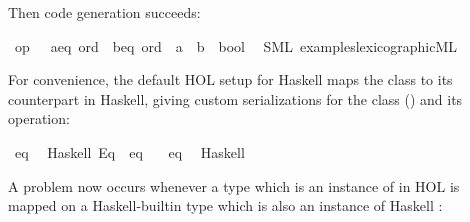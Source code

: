 \begin{isabellebody}
%
\endisatagproof
{\isafoldproof}%
%
\isadelimproof
%
\endisadelimproof
%
\begin{isamarkuptext}%
Then code generation succeeds:%
\end{isamarkuptext}%
\isamarkuptrue%
\isamarkupfalse%
\ {\isachardoublequoteopen}op\ {\isasymle}\ {\isasymColon}\ {\isacharprime}a{\isasymColon}{\isacharbraceleft}eq{\isacharcomma}\ ord{\isacharbraceright}\ {\isasymtimes}\ {\isacharprime}b{\isasymColon}{\isacharbraceleft}eq{\isacharcomma}\ ord{\isacharbraceright}\ {\isasymRightarrow}\ {\isacharprime}a\ {\isasymtimes}\ {\isacharprime}b\ {\isasymRightarrow}\ bool{\isachardoublequoteclose}\isanewline
\ \ {\isacharparenleft}SML\ {\isachardoublequoteopen}examples{\isacharslash}lexicographic{\isachardot}ML{\isachardoublequoteclose}{\isacharparenright}%
\begin{isamarkuptext}%
%
\end{isamarkuptext}%
\isamarkuptrue%
%
\isamarkuptrue%
%
\begin{isamarkuptext}%
For convenience, the default
  HOL setup for Haskell maps the  class to
  its counterpart in Haskell, giving custom serializations
  for the class (\isa{{\isasymCODECLASS}}) and its operation:%
\end{isamarkuptext}%
\isamarkuptrue%
%
\isadelimML
%
\endisadelimML
%
\isatagML
%
\endisatagML
{\isafoldML}%
%
\isadelimML
%
\endisadelimML
\isanewline
%
\isadelimtt
%
\endisadelimtt
%
\isatagtt
{}\isamarkupfalse%
\ eq\isanewline
\ \ {\isacharparenleft}Haskell\ {\isachardoublequoteopen}Eq{\isachardoublequoteclose}\ \ eq\ {\isasymequiv}\ {\isachardoublequoteopen}{\isacharparenleft}{\isacharequal}{\isacharequal}{\isacharparenright}{\isachardoublequoteclose}{\isacharparenright}\isanewline
\isanewline
{}\isamarkupfalse%
\ eq\isanewline
\ \ {\isacharparenleft}Haskell\ \ {}\ {\isachardoublequoteopen}{\isacharequal}{\isacharequal}{\isachardoublequoteclose}{\isacharparenright}\isanewline
%
\endisatagtt
{\isafoldtt}%
%
\isadelimtt
%
\endisadelimtt
%
\isadelimML
%
\endisadelimML
%
\isatagML
%
\endisatagML
{\isafoldML}%
%
\isadelimML
%
\endisadelimML
%
\begin{isamarkuptext}%
A problem now occurs whenever a type which
  is an instance of  in HOL is mapped
  on a Haskell-builtin type which is also an instance
  of Haskell :%

\end{isamarkuptext}
\end{isabellebody}
